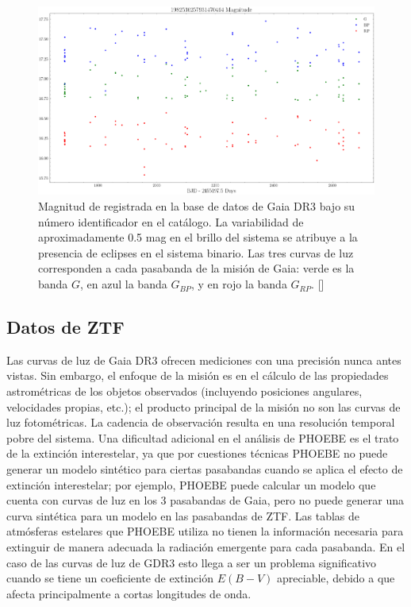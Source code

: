 \begin{figure}[!ht]
	\centering
	\includegraphics[scale=0.4]{Muestra/Secciones/Figures/GDR3-Light-Curves.png}
	\caption{Magnitud de \atoObjId registrada en la base de datos de Gaia DR3
	bajo su número identificador en el catálogo. La variabilidad de
	aproximadamente 0.5 mag en el brillo del sistema se atribuye a la presencia
	de eclipses en el sistema binario. Las tres curvas de luz corresponden a
	cada pasabanda de la misión de Gaia: verde es la banda $G$, en azul la banda
	$G_{BP}$, y en rojo la banda $G_{RP}$.
	[]}
	\label{gdr3AtoObjLightCurves}
\end{figure}

\subsection{Datos de ZTF}

Las curvas de luz de Gaia DR3 ofrecen mediciones con una precisión nunca antes
vistas. Sin embargo, el enfoque de la misión es en el cálculo de las propiedades
astrométricas de los objetos observados (incluyendo posiciones angulares,
velocidades propias, etc.); el producto principal de la misión no son las curvas
de luz fotométricas. La cadencia de observación resulta en una resolución
temporal pobre del sistema. Una dificultad adicional en el análisis de PHOEBE es
el trato de la extinción interestelar, ya que por cuestiones técnicas PHOEBE no
puede generar un modelo sintético para ciertas pasabandas cuando se aplica el
efecto de extinción interestelar; por ejemplo, PHOEBE puede calcular un
modelo que cuenta con curvas de luz en los 3 pasabandas de Gaia, pero no puede
generar una curva sintética para un modelo en las pasabandas de ZTF. Las tablas
de atmósferas estelares que PHOEBE utiliza no tienen la información necesaria
para extinguir de manera adecuada la radiación emergente para cada pasabanda.
En el caso de las curvas de luz de GDR3 esto llega a ser un problema
significativo cuando se tiene un coeficiente de extinción $E(B - V)$ apreciable,
debido a que afecta principalmente a cortas longitudes de onda.

